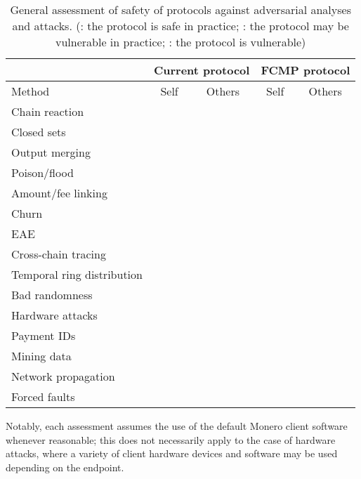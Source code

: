\documentclass{article}
\newcommand{\cmark}{\ding{51}}
\newcommand{\xmark}{\ding{55}}
\newcommand{\hmark}{\ding{119}}
\theoremstyle{definition}
\begin{document}
\begin{table}[h]
\begin{tabular}{|l|cc|cc|}
\hline
& \multicolumn{2}{|c|}{Current protocol} & \multicolumn{2}{|c|}{FCMP protocol} \\
\hline
Method & Self & Others & Self & Others \\
\hline
Chain reaction & \cmark & \cmark & \cmark & \cmark \\
Closed sets & \cmark & \cmark & \cmark & \cmark \\
Output merging & \hmark & \cmark & \cmark & \cmark \\
Poison/flood & \multicolumn{2}{|c|}{\xmark} & \multicolumn{2}{|c|}{\cmark} \\
Amount/fee linking & \xmark & \cmark & \xmark & \cmark \\
Churn & \hmark & \cmark & \cmark & \cmark \\
EAE & \hmark & \cmark & \cmark & \cmark \\
Cross-chain tracing & \xmark & \hmark & \hmark & \cmark \\
Temporal ring distribution & \cmark & \cmark & \cmark & \cmark \\
Bad randomness & \cmark & \cmark & \cmark & \cmark \\
Hardware attacks & \multicolumn{2}{|c|}{\hmark} & \multicolumn{2}{|c|}{\hmark} \\
Payment IDs & \cmark & \cmark & \cmark & \cmark \\
Mining data & \hmark & \xmark & \hmark & \cmark \\
Network propagation & \hmark & \cmark & \hmark & \cmark \\
Forced faults & \hmark & \cmark & \hmark & \cmark \\
\hline
\end{tabular}
\caption{General assessment of safety of protocols against adversarial analyses and attacks. (\cmark: the protocol is safe in practice; \hmark: the protocol may be vulnerable in practice; \xmark: the protocol is vulnerable)}
\label{tab:assessment}
\end{table}

Notably, each assessment assumes the use of the default Monero client software whenever reasonable; this does not necessarily apply to the case of hardware attacks, where a variety of client hardware devices and software may be used depending on the endpoint.
\end{document}
